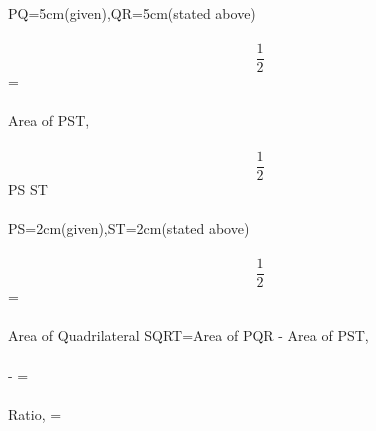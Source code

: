 \documentclass[a4paper,12pt,two column]{article}
\begin{document}
PQ=5cm(given),QR=5cm(stated above)\\\\
\implies
\[\frac{1}{2}\]   \hspace{0.1cm} = \hspace{0.1cm} \\\\
Area \hspace{0.1cm} of\hspace{0.1cm} \triangle PST,\\\\
\implies
\[\frac{1}{2}\] \hspace{0.2cm} \times \hspace{0.2cm} PS \hspace{0.2cm} \times \hspace{0.2cm} ST\\\\
PS=2cm(given),ST=2cm(stated above)\\\\
\implies
\[\frac{1}{2}\]   \hspace{0.1cm} = \hspace{0.1cm} \\\\
Area \hspace{0.1cm}of\hspace{0.1cm} Quadrilateral\hspace{0.1cm} SQRT\hspace{0.1cm}=\hspace{0.1cm}Area\hspace{0.1cm} of\hspace{0.1cm} \triangle PQR - Area \hspace{0.1cm}of\hspace{0.1cm} \triangle PST,\\\\
\implies
{}- = \\\\
Ratio,
 = \\\\
\end{document}
